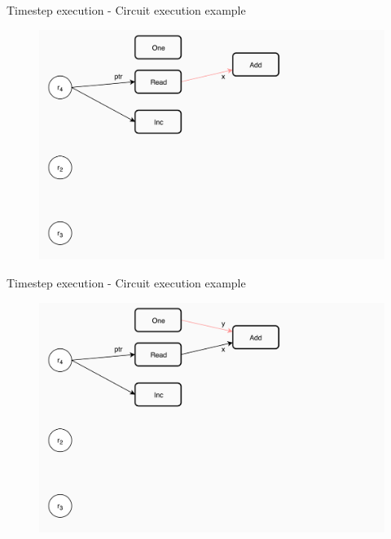 \documentclass[xcolor={usenames}]{beamer}
\begin{document}
  \begin{frame}{Timestep execution - Circuit execution example}
  	\begin{figure}
  		\centering
  		\includegraphics[width=\textwidth]{../figures/example-circuit-7.png}
  	\end{figure}
  \end{frame}
  \begin{frame}{Timestep execution - Circuit execution example}
  	\begin{figure}
  		\centering
  		\includegraphics[width=\textwidth]{../figures/example-circuit-8.png}
  	\end{figure}
  \end{frame}
\end{document}
